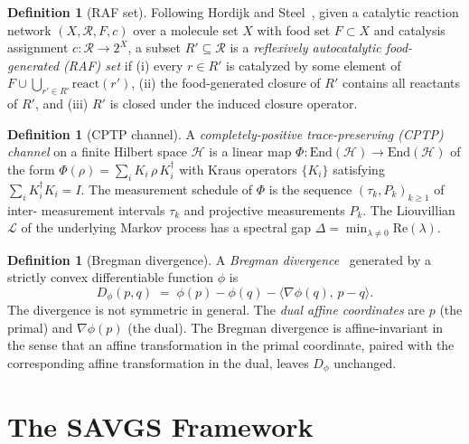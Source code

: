 \documentclass[11pt,a4paper]{article}
\theoremstyle{plain}
\theoremstyle{definition}
\newtheorem{definition}[theorem]{Definition}
\theoremstyle{remark}
\newcommand{\HH}{\mathcal{H}}
\newcommand{\End}{\mathrm{End}}
\begin{document}
\begin{definition}[RAF set]
\label{def:raf}
Following Hordijk and Steel~\cite{steel2004,hordijk2011}, given a
catalytic reaction network $(X, \mathcal{R}, F, c)$ over a molecule set
$X$ with food set $F\subset X$ and catalysis assignment $c:\mathcal{R}
\to 2^X$, a subset $R'\subseteq\mathcal{R}$ is a \emph{reflexively
autocatalytic food-generated (RAF) set} if (i) every $r\in R'$ is
catalyzed by some element of $F\cup\bigcup_{r'\in R'}\mathrm{react}(r')$,
(ii) the food-generated closure of $R'$ contains all reactants of $R'$,
and (iii) $R'$ is closed under the induced closure operator.
\end{definition}

\begin{definition}[CPTP channel]
\label{def:cptp}
A \emph{completely-positive trace-preserving (CPTP) channel} on a finite
Hilbert space $\HH$ is a linear map $\Phi:\End(\HH)\to\End(\HH)$ of the
form $\Phi(\rho)=\sum_i K_i\,\rho\,K_i^\dagger$ with Kraus operators
$\{K_i\}$ satisfying $\sum_i K_i^\dagger K_i = I$. The measurement
schedule of $\Phi$ is the sequence $(\tau_k, P_k)_{k\geq 1}$ of inter-
measurement intervals $\tau_k$ and projective measurements $P_k$. The
Liouvillian $\mathcal{L}$ of the underlying Markov process has a spectral
gap $\Delta = \min_{\lambda\neq 0}\mathrm{Re}(\lambda)$.
\end{definition}

\begin{definition}[Bregman divergence]
\label{def:bregman}
A \emph{Bregman divergence}~\cite{bregman1967,amari2000} generated by
a strictly convex differentiable function $\phi$ is
\begin{equation}
  D_\phi(p,q) \;=\; \phi(p) - \phi(q) - \langle\nabla\phi(q),\, p-q\rangle.
\end{equation}
The divergence is not symmetric in general. The \emph{dual affine
coordinates} are $p$ (the primal) and $\nabla\phi(p)$ (the dual). The
Bregman divergence is affine-invariant in the sense that an affine
transformation in the primal coordinate, paired with the corresponding
affine transformation in the dual, leaves $D_\phi$ unchanged.
\end{definition}

\section{The SAVGS Framework}\label{sec:savgs}
\end{document}
